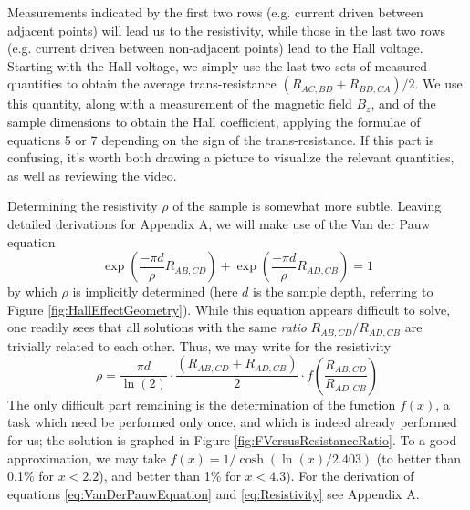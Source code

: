 \documentclass{../lab}
\begin{document}
Measurements indicated by the first two rows (e.g. current driven between adjacent points) will lead us to the resistivity, while those in the last two rows (e.g. current driven between non-adjacent points) lead to the Hall voltage. Starting with the Hall voltage, we simply use the last two sets of measured quantities to obtain the average trans-resistance $(R_{AC,BD} + R_{BD,CA})/2$. We use this quantity, along with a measurement of the magnetic field $B_z$, and of the sample dimensions to obtain the Hall coefficient, applying the formulae of equations 5 or 7 depending on the sign of the trans-resistance. If this part is confusing, it's worth both drawing a picture to visualize the relevant quantities, as well as reviewing the video.

\newpage

Determining the resistivity $\rho$ of the sample is somewhat more subtle. Leaving detailed derivations for Appendix A, we will make use of the Van der Pauw equation
\begin{equation}
\label{eq:VanDerPauwEquation}
    \exp \left(\frac{-\pi d}{\rho} R_{AB,CD} \right) + \exp \left(\frac{-\pi d}{\rho} R_{AD,CB} \right) = 1
\end{equation}
by which $\rho$ is implicitly determined (here $d$ is the sample depth, referring to Figure \ref{fig:HallEffectGeometry}). While this equation appears difficult to solve, one readily sees that all solutions with the same \emph{ratio} $R_{AB,CD} / R_{AD,CB}$ are trivially related to each other. Thus, we may write for the resistivity
\begin{equation}
\label{eq:Resistivity}
    \rho = \frac{\pi d}{\ln(2)} \cdot \frac{(R_{AB,CD}+R_{AD,CB})}{2} \cdot f \left( \frac{R_{AB,CD}}{R_{AD,CB}} \right)
\end{equation}
The only difficult part remaining is the determination of the function $f(x)$, a task which need be performed only once, and which is indeed already performed for us; the solution is graphed in Figure \ref{fig:FVersusResistanceRatio}. To a good approximation, we may take $f(x) = 1/\cosh(\ln(x)/2.403)$ (to better than 0.1\% for $x < 2.2$), and better than 1\% for $x < 4.3$). For the derivation of equations \eqref{eq:VanDerPauwEquation} and \eqref{eq:Resistivity} see Appendix A.
\end{document}
